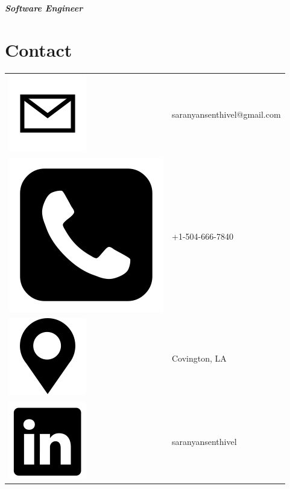 \documentclass[a4paper,10pt,oneside]{article}
\begin{document}
\begin{sloppypar}
\begin{paracol}{2}

\begin{leftcolumn}
\maketitle
\begin{flushleft}
\emph{\textbf{\LARGE{Software Engineer}}}
\end{flushleft}
\vspace{-2em}
\section*{Contact}
\vspace{-1em}

\begin{flushleft}
    \begin{tabular}[b]{m{1.5em} m{10em}}
        \includegraphics[width=.75cm,height=.75cm]{images/email.png} & \Large saranyansenthivel@gmail.com  \\
        \includegraphics[width=.75cm,height=.75cm]{images/phone.png} & \Large +1-504-666-7840\\
        \includegraphics[width=.75cm,height=.75cm]{images/address.png} & 
        \Large Covington, LA\\
        \includegraphics[width=.75cm,height=.75cm]{images/linkedin.png} & \Large saranyansenthivel\\
    \end{tabular}
\end{flushleft}


\end{leftcolumn}
\end{paracol}
\end{sloppypar}
\end{document}
